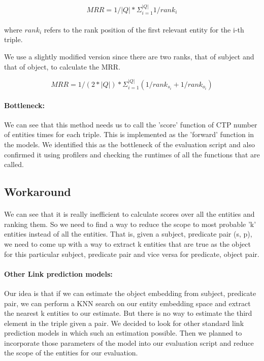 \documentclass[Other]{iitddiss}
\begin{document}
\[MRR = 1/|Q| * \Sigma_{i=1}^{|Q|} 1/rank_{i}\]
\\
where \(rank_{i}\) refers to the rank position of the first relevant entity for the i-th triple.


We use a slightly modified version since there are two ranks, that of subject and that of object, to calculate the MRR.

\[MRR = 1/(2*|Q|) * \Sigma_{i=1}^{|Q|} (1/rank_{s_{i}} + 1/rank_{o_{i}})\]


\paragraph{Bottleneck:}
We can see that this method needs us to call the 'score' function of CTP number of entities times for each triple. This is implemented as the 'forward' function in the models. We identified this as the bottleneck of the evaluation script and also confirmed it using profilers and checking the runtimes of all the functions that are called.

\subsection{Workaround}
\paragraph{}
We can see that it is really inefficient to calculate scores over all the entities and ranking them. So we need to find a way to reduce the scope to most probable 'k' entities instead of all the entities. That is, given a subject, predicate pair (s, p), we need to come up with a way to extract k entities that are true as the object for this particular subject, predicate pair and vice versa for predicate, object pair.

\paragraph{Other Link prediction models:}
Our idea is that if we can estimate the object embedding from subject, predicate pair, we can perform a KNN search on our entity embedding space and extract the nearest k entities to our estimate. But there is no way to estimate the third element in the triple given a pair. We decided to look for other standard link prediction models in which such an estimation possible. Then we planned to incorporate those parameters of the model into our evaluation script and reduce the scope of the entities for our evaluation.
\end{document}
